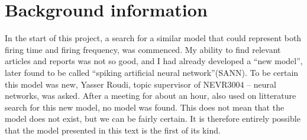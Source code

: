 \documentclass[b5paper,11 pt]{report}
\begin{document}
\tableofcontents








\chapter{Background information} 	%
	In the start of this project, a search for a similar model that could represent both firing time and firing frequency, was commenced.
	My ability to find relevant articles and reports was not so good, and
	 	I had already developed a ``new model'', later found to be called ``spiking artificial neural network''(SANN).
	To be certain this model was new, Yasser Roudi, topic supervisor of NEVR3004 -- neural networks, was asked. 
	After a meeting for about an hour, also used on litterature search for this new model, no model was found.
	This does not mean that the model does not exist, but we can be fairly certain.
	It is therefore entirely possible that the model presented in this text is the first of its kind.

	
\end{document}
